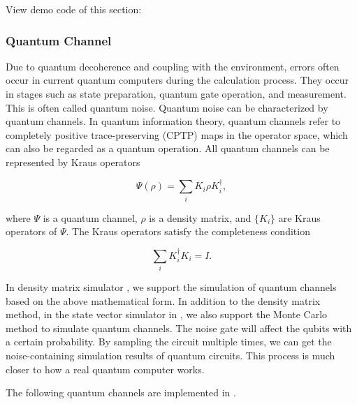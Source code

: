 \label{sec:noise_simulation}

View demo code of this section:  \ 

\subsubsection{Quantum Channel}
Due to quantum decoherence and coupling with the environment, errors often occur in current quantum computers during the calculation process. They occur in stages such as state preparation, quantum gate operation, and measurement. This is often called quantum noise. Quantum noise can be characterized by quantum channels. In quantum information theory, quantum channels refer to completely positive trace-preserving (CPTP) maps in the operator space, which can also be regarded as a quantum operation. All quantum channels can be represented by Kraus operators

\begin{equation}
    \Psi(\rho) = \sum_i K_i \rho K_i^\dagger,
\end{equation}

where $\Psi$ is a quantum channel, $\rho$ is a density matrix, and $\{K_i\}$ are Kraus operators of $\Psi$. The Kraus operators satisfy the completeness condition

\begin{equation}
    \sum_i K_i^\dagger K_i = I.
\end{equation}

In density matrix simulator , we support the simulation of quantum channels based on the above mathematical form. In addition to the density matrix method, in the state vector simulator  in \MindQuantum, we also support the Monte Carlo method to simulate quantum channels. The noise gate will affect the qubits with a certain probability. By sampling the circuit multiple times, we can get the noise-containing simulation results of quantum circuits. This process is much closer to how a real quantum computer works.

The following quantum channels are implemented in \MindQuantum.

